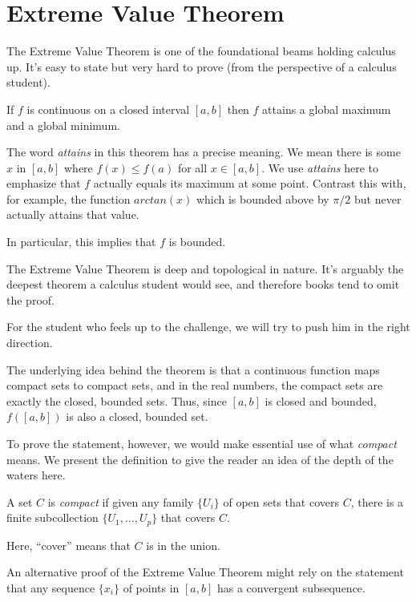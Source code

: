\documentclass[11pt]{book}
\newenvironment{definition}[1][Definition]{\begin{trivlist}
\item[\hskip \labelsep {\bfseries #1}]}{\end{trivlist}}
\numberwithin{example}{chapter}
\begin{document}
\section{Extreme Value Theorem}


The Extreme Value Theorem is one of the foundational beams holding calculus up.  It's easy to state but very hard to prove (from the perspective of a calculus student).

\begin{theorem}
If $f$ is continuous on a closed interval $[a,b]$ then $f$ attains a global maximum and a global minimum.  
\end{theorem}

The word \emph{attains} in this theorem has a precise meaning.  We mean there is some $x$ in $[a,b]$ where $f(x)\leq f(a)$ for all $x\in [a,b]$.  We use \emph{attains} here to emphasize that $f$ actually equals its maximum at some point.  Contrast this with, for example, the function $arctan(x)$ which is bounded above by $\pi/2$ but never actually attains that value.  

In particular, this implies that $f$ is bounded.  

The Extreme Value Theorem is deep and topological in nature.  It's arguably the deepest theorem a calculus student would see, and therefore books tend to omit the proof.  

For the student who feels up to the challenge, we will try to push him in the right direction. 

The underlying idea behind the theorem is that a continuous function maps compact sets to compact sets, and in the real numbers, the compact sets are exactly the closed, bounded sets.  Thus, since $[a,b]$ is closed and bounded, $f([a,b])$ is also a closed, bounded set.

To prove the statement, however, we would make essential use of what \emph{compact} means.  We present the definition to give the reader an idea of the depth of the waters here.

\begin{definition}
A set $C$ is \emph{compact} if given any family $\{U_i\}$ of open sets that covers $C$, there is a finite subcollection $\{U_1, \ldots, U_p\}$ that covers $C$.  
\end{definition}

Here, ``cover'' means that $C$ is in the union.  


An alternative proof of the Extreme Value Theorem might rely on the statement that any sequence $\{x_i\}$ of points in $[a,b]$ has a convergent subsequence.  
\end{document}
